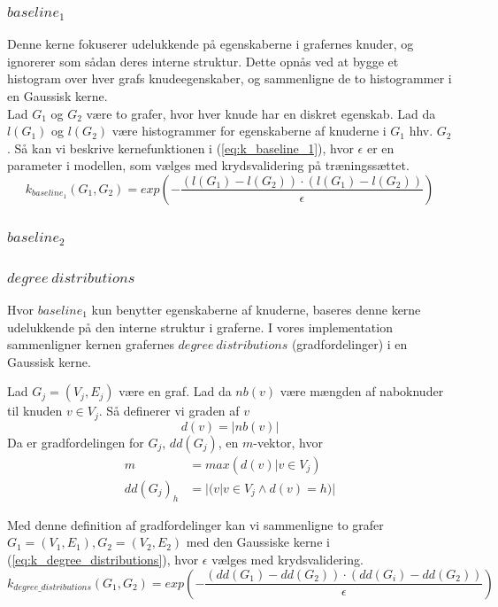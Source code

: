 \documentclass{article}
\begin{document}
\subsubsection{$baseline_1$}
Denne kerne fokuserer udelukkende på egenskaberne i grafernes knuder, og ignorerer som sådan deres interne struktur. Dette opnås ved at bygge et histogram over hver grafs knudeegenskaber, og sammenligne de to histogrammer i en Gaussisk kerne.\\
Lad $G_1$ og $G_2$ være to grafer, hvor hver knude har en diskret egenskab. Lad da $l(G_1)$ og $l(G_2)$ være histogrammer for egenskaberne af knuderne i $G_1$ hhv. $G_2$. Så kan vi beskrive kernefunktionen i (\ref{eq:k_baseline_1}), hvor $\epsilon$ er en parameter i modellen, som vælges med krydsvalidering på træningssættet.
\begin{equation}
\label{eq:k_baseline_1}
k_{baseline_1}(G_1,G_2)=exp\left(-\frac{\left(l(G_1)- l(G_2)\right)\cdot\left(l(G_1)- l(G_2)\right)}{\epsilon}\right)
\end{equation}


\subsubsection{$baseline_2$}

\subsubsection{$degree\ distributions$}
Hvor $baseline_1$ kun benytter egenskaberne af knuderne, baseres denne kerne udelukkende  på den interne struktur i graferne. I vores implementation sammenligner kernen grafernes $degree\ distributions$ (gradfordelinger) i en Gaussisk kerne.

Lad $G_j=(V_j,E_j)$ være en graf. Lad da $nb(v)$ være mængden af naboknuder til knuden $v\in V_j$. Så definerer vi graden af $v$
\begin{equation}
d(v) = |nb(v)|
\end{equation}
Da er gradfordelingen for $G_j$, $dd(G_j)$, en $m$-vektor, hvor
\begin{align}
m&=max(d(v) | v\in V_j)\\
dd(G_j)_h&=|(v | v\in V_j \land d(v) = h)|
\end{align}

Med denne definition af gradfordelinger kan vi sammenligne to grafer $G_1=(V_1,E_1),G_2=(V_2,E_2)$ med den Gaussiske kerne i (\ref{eq:k_degree_distributions}), hvor $\epsilon$ vælges med krydsvalidering.
\begin{equation}
\label{eq:k_degree_distributions}
k_{degree\_distributions}(G_1,G_2)=exp\left(-\frac{(dd(G_1)-dd(G_2))\cdot(dd(G_i)-dd(G_2))}{\epsilon}\right)
\end{equation}
\end{document}
